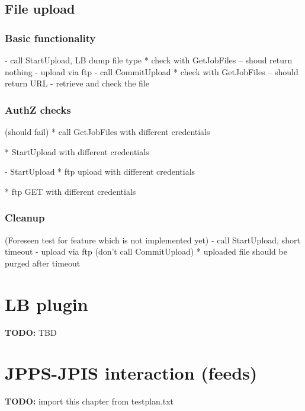 \documentclass{egee}
\def\todo#1{\textbf{TODO:} #1}
\begin{document}
\subsection{File upload}

\subsubsection{Basic functionality}
- call StartUpload, LB dump file type
* check with GetJobFiles -- shoud return nothing
- upload via ftp
- call CommitUpload
* check with GetJobFiles -- should return URL
- retrieve and check the file

\subsubsection{AuthZ checks}
(should fail)
* call GetJobFiles with different credentials

* StartUpload with different credentials

- StartUpload
* ftp upload with different credentials

* ftp GET with different credentials

\subsubsection{Cleanup}
(Foreseen test for feature which is not implemented yet)
- call StartUpload, short timeout
- upload via ftp
(don't call CommitUpload)
* uploaded file should be purged after timeout

\section{LB plugin}
\todo{TBD}

\section{JPPS-JPIS interaction (feeds)}

\todo{import this chapter from testplan.txt}



\end{document}
